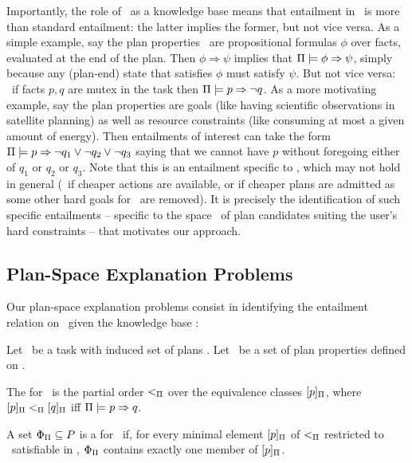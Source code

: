 Importantly, the role of \plans\ as a knowledge base means that
entailment in \plans\ is more than standard entailment: the latter
implies the former, but not vice versa. As a simple example, say the
plan properties \props\ are propositional formulas $\phi$ over facts,
evaluated at the end of the plan. Then $\phi \Rightarrow \psi$ implies
that $\Pi \models \phi \Rightarrow \psi$, simply because any (plan-end)
state that satisfies $\phi$ must satisfy $\psi$. But not vice versa:
\eg\ if facts $p, q$ are mutex in the task then
$\Pi \models p \Rightarrow \neg q$. As a more motivating example, say the
plan properties are goals (like having scientific observations in
satellite planning) as well as resource constraints (like consuming at
most a given amount of energy). Then entailments of interest can take
the form $\Pi \models p \Rightarrow \neg q_1 \vee \neg q_2 \vee \neg q_3$
saying that we cannot have $p$ without foregoing either of $q_1$ or
$q_2$ or $q_3$. Note that this is an entailment specific to \plans,
which may not hold in general (\eg\ if cheaper actions are available,
or if cheaper plans are admitted as some other hard goals for
\plans\ are removed). It is precisely the identification of such
specific entailments -- specific to the space \plans\ of plan
candidates suiting the user's hard constraints -- that motivates our
approach.





\subsection{Plan-Space Explanation Problems}

Our plan-space explanation problems consist in identifying the
entailment relation on \props\ given the knowledge base \plans:

\begin{definition}
Let \task\ be a task with induced set of plans \plans. Let \props\ be
a set of plan properties defined on \task.

The  for \plans\ is the
partial order $<_{\Pi}$ over the equivalence classes
$[p]_{\Pi}$, where $[p]_{\Pi} <_{\Pi}
[q]_{\Pi}$ iff $\Pi \models p \Rightarrow q$.

A set $\Phi_{\Pi} \subseteq P$ is a  for \plans\ if, for every minimal
element $[p]_{\Pi}$ of $<_{\Pi}$ restricted to
\prop\ satisfiable in \plans, $\Phi_{\Pi}$ contains exactly one
member of $[p]_{\Pi}$.
\end{definition}

